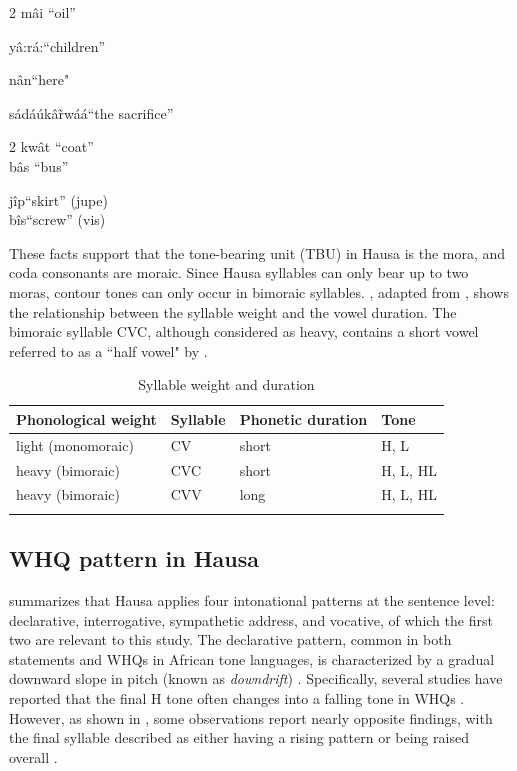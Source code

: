 \documentclass[output=paper,colorlinks,citecolor=brown
]{langscibook}
\begin{document}
\begin{multicols}{2}
\ea \label{ex:Li:ftone}
mâi \quad ``oil''

yâ:rá:\quad ``children''

nân\quad ``here"

sádáúkâr̃wáá\quad ``the sacrifice''
\z
\end{multicols}


\begin{multicols}{2}
\ea\label{ex:Li:loan}
kwât  \quad ``coat''  \\  
bâs \quad ``bus''  
 
jîp\quad ``skirt'' (jupe)\\ 
bîs\quad ``screw'' (vis)\z
\end{multicols}

These facts support that the tone-bearing unit (TBU) in Hausa is the mora, and coda consonants are moraic. Since Hausa syllables can only bear up to two moras, contour tones can only occur in bimoraic syllables. , adapted from \citet{dresel1977}, shows the relationship between the syllable weight and the vowel duration. The bimoraic syllable CVC, although considered as heavy, contains a short vowel referred to as a ``half vowel" by \citet[p. 711]{newmangrammar}.

\begin{table}
\begin{tabular}{llll}
\lsptoprule
 Phonological weight  	& 	Syllable 	& 	Phonetic duration  	& 	Tone\\
 \midrule
  light (monomoraic) 		& 	CV				& {short} 	& H, L\\
heavy (bimoraic) & CVC& 	short	&  H, L, HL\\
heavy (bimoraic)    		    & CVV	& long &	H, L, HL	\\
\lspbottomrule
\end{tabular}

\caption{Syllable weight and duration}
\label{tab:Li:dresel}
\end{table}
\subsection{WHQ pattern in Hausa}
\citet[p.~612]{newmangrammar} summarizes that Hausa applies four intonational patterns at the sentence level: declarative, interrogative, sympathetic address, and vocative, of which the first two are relevant to this study. The declarative pattern, common in both statements and WHQs in African tone languages, is characterized by a gradual downward slope in pitch (known as \textit{downdrift}) \citep{downing}. Specifically, several studies have reported that the final H tone often changes into a falling tone in WHQs \citep{kk,miller,newmangrammar}. However, as shown in , some observations report nearly opposite findings, with the final syllable described as either having a rising pattern \citep{dresel1977} or being raised overall \citep{meyers1976aspects}.
\end{document}
